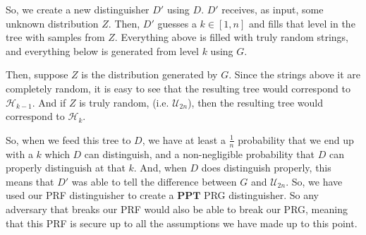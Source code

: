\documentclass[11pt]{article}
\newcommand{\PPT}{\mathbf{PPT}}
\newcommand{\mcH}{\mathcal{H}}
\newcommand{\mcU}{\mathcal{U}}
\begin{document}
So, we create a new distinguisher \(D'\) using \(D\). \(D'\) receives, as input, some unknown distribution \(Z\). Then, \(D'\) guesses a \(k\in[1,n]\) and fills that level in the tree with samples from \(Z\). Everything above is filled with truly random strings, and everything below is generated from level \(k\) using \(G\). \smallskip

Then, suppose \(Z\) is the distribution generated by \(G\). Since the strings above it are completely random, it is easy to see that the resulting tree would correspond to \(\mcH_{k-1}\). And if \(Z\) is truly random, (i.e. \(\mcU_{2n}\)), then the resulting tree would correspond to \(\mcH_{k}\).\smallskip

So, when we feed this tree to \(D\), we have at least a \(\frac{1}{n}\) probability that we end up with a \(k\) which \(D\) can distinguish, and a non-negligible probability that \(D\) can properly distinguish at that \(k\). And, when \(D\) does distinguish properly, this means that \(D'\) was able to tell the difference between \(G\) and \(\mcU_{2n}\). So, we have used our PRF distinguisher to create a \(\PPT\) PRG distinguisher. So any adversary that breaks our PRF would also be able to break our PRG, meaning that this PRF is secure up to all the assumptions we have made up to this point.
\end{document}
